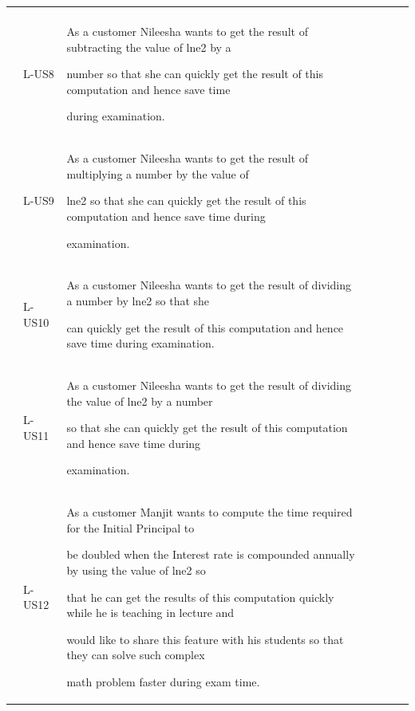\documentclass[12pt]{article}
\begin{document}
{\begin{longtable}{p{0.56in}p{0.65in}p{1.19in}p{0.53in}p{0.46in}p{0.64in}p{0.99in}}
\multicolumn{1}{|p{0.53in}}{} & 
\multicolumn{1}{|p{0.46in}}{} & 
\multicolumn{1}{|p{0.64in}}{} & 
\multicolumn{1}{|p{0.99in}|}{} \\
\hhline{-------}
\multicolumn{1}{|p{0.56in}}{Local} & 
\multicolumn{1}{|p{0.65in}}{L-US8} & 
\multicolumn{1}{|p{1.19in}}{As a customer Nileesha wants to get the result of subtracting the value of lne2 by a \par number so that she can quickly get the result of this computation and hence save time \par during examination.} & 
\multicolumn{1}{|p{0.53in}}{} & 
\multicolumn{1}{|p{0.46in}}{} & 
\multicolumn{1}{|p{0.64in}}{} & 
\multicolumn{1}{|p{0.99in}|}{} \\
\hhline{-------}
\multicolumn{1}{|p{0.56in}}{Local} & 
\multicolumn{1}{|p{0.65in}}{L-US9} & 
\multicolumn{1}{|p{1.19in}}{As a customer Nileesha wants to get the result of multiplying a number by the value of \par lne2 so that she can quickly get the result of this computation and hence save time during \par examination.} & 
\multicolumn{1}{|p{0.53in}}{} & 
\multicolumn{1}{|p{0.46in}}{} & 
\multicolumn{1}{|p{0.64in}}{} & 
\multicolumn{1}{|p{0.99in}|}{} \\
\hhline{-------}
\multicolumn{1}{|p{0.56in}}{Local} & 
\multicolumn{1}{|p{0.65in}}{L-US10} & 
\multicolumn{1}{|p{1.19in}}{As a customer Nileesha wants to get the result of dividing a number by lne2 so that she \par can quickly get the result of this computation and hence save time during examination.} & 
\multicolumn{1}{|p{0.53in}}{} & 
\multicolumn{1}{|p{0.46in}}{} & 
\multicolumn{1}{|p{0.64in}}{} & 
\multicolumn{1}{|p{0.99in}|}{} \\
\hhline{-------}
\multicolumn{1}{|p{0.56in}}{Local} & 
\multicolumn{1}{|p{0.65in}}{L-US11} & 
\multicolumn{1}{|p{1.19in}}{As a customer Nileesha wants to get the result of dividing the value of lne2 by a number \par so that she can quickly get the result of this computation and hence save time during \par examination.} & 
\multicolumn{1}{|p{0.53in}}{} & 
\multicolumn{1}{|p{0.46in}}{} & 
\multicolumn{1}{|p{0.64in}}{} & 
\multicolumn{1}{|p{0.99in}|}{} \\
\hhline{-------}
\multicolumn{1}{|p{0.56in}}{Local} & 
\multicolumn{1}{|p{0.65in}}{L-US12} & 
\multicolumn{1}{|p{1.19in}}{As a customer Manjit wants to compute the time required for the Initial Principal to \par be doubled when the Interest rate is compounded annually by using the value of lne2 so \par that he can get the results of this computation quickly while he is teaching in lecture and \par would like to share this feature with his students so that they can solve such complex \par math problem faster during exam time.} & 

\end{longtable}}
\end{document}
